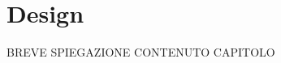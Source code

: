 \chapter{Design} %
%

\begin{citazione}
BREVE SPIEGAZIONE CONTENUTO CAPITOLO
\end{citazione}

\newpage
